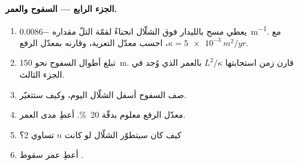 \begin{problem}
\medskip\noindent\textbf{الجزء الرابع --- السفوح والعمر.}
\begin{enumerate}[resume]
\item يعطي مسح بالليدار فوق الشلّال انحناءً لقمّة التلّ مقداره
  \qty{-0.0086}{m^{-1}}. مع $\kappa = \qty{5e-3}{m^2/yr}$، احسب
  معدّل التعرية، وقارنه بمعدّل الرفع.
\item تبلغ أطوال السفوح نحو \qty{150}{m}. قارن زمن استجابتها
  $L^2/\kappa$ بالعمر الذي وُجد في الجزء الثالث.
\item صف السفوح أسفل الشلّال اليوم، وكيف
  ستتغيّر.
\item معدّل الرفع معلوم بدقّة \qty{20}{\percent}. أعطِ مدى
  العمر.
\item كيف كان سيتطوّر الشلّال لو كانت $n$ تساوي 2؟
\item أعطِ عمر سقوط .
\end{enumerate}
\end{problem}
